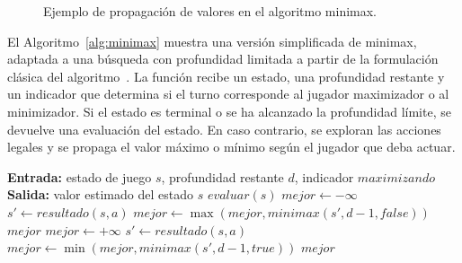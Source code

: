 \begin{figure}[htbp]
\centering
{}
\caption{Ejemplo de propagación de valores en el algoritmo minimax.}
\label{fig:minimax-tree}
\end{figure}
\vspace{1cm}


El Algoritmo~\ref{alg:minimax} muestra una versión simplificada de minimax, adaptada a una búsqueda con profundidad limitada a partir de la formulación clásica del algoritmo~\cite{russell2020aima}. La función recibe un estado, una profundidad restante y un indicador que determina si el turno corresponde al jugador maximizador o al minimizador. Si el estado es terminal o se ha alcanzado la profundidad límite, se devuelve una evaluación del estado. En caso contrario, se exploran las acciones legales y se propaga el valor máximo o mínimo según el jugador que deba actuar.

\vspace{0.3cm}
\begin{algorithm}[H]
\caption{Algoritmo minimax}
\label{alg:minimax}
\begin{algorithmic}[1]
\State \textbf{Entrada:} estado de juego $s$, profundidad restante $d$, indicador $maximizando$
\State \textbf{Salida:} valor estimado del estado $s$
    \State \Return $evaluar(s)$
\EndIf
{}
    \State $mejor \gets -\infty$
        \State $s' \gets resultado(s, a)$
        \State $mejor \gets \max(mejor, minimax(s', d - 1, false))$
    \EndFor
    \State \Return $mejor$
\Else
    \State $mejor \gets +\infty$
        \State $s' \gets resultado(s, a)$
        \State $mejor \gets \min(mejor, minimax(s', d - 1, true))$
    \EndFor
    \State \Return $mejor$
\EndIf
\end{algorithmic}
\end{algorithm}

